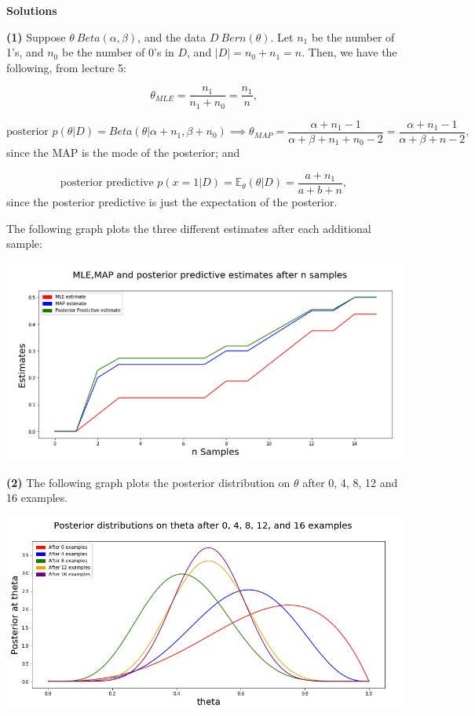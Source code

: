 \documentclass[submit]{harvardml}
\begin{document}
\noindent\textbf{Solutions}

\noindent\textbf{(1)} Suppose $\theta ~ Beta(\alpha,\beta)$, and the data $D ~ Bern(\theta)$. Let $n_1$ be the number of 1's, and $n_0$ be the number of 0's in $D$, and $|D| = n_0 +n_1 = n$. Then, we have the following, from lecture 5:


$$\boxed{ \theta_{MLE} = \frac{n_1}{n_1+n_0} = \frac{n_1}{n}},$$


$$\text{posterior } p(\theta | D) = Beta(\theta | \alpha + n_1, \beta + n_0) \implies \boxed {\theta_{MAP} = \frac{\alpha + n_1 -1}{\alpha + \beta + n_1 + n_0 -2} = \frac{\alpha + n_1 -1}{\alpha + \beta +n -2}},$$
since the MAP is the mode of the posterior; and

$$\text{posterior predictive } \boxed{p(x=1 | D) = \mathbb{E}_\theta (\theta | D) = \frac{a+n_1}{a+b+n}},$$
since the posterior predictive is just the expectation of the posterior.

\noindent The following graph plots the three different estimates after each additional sample:

\begin{center}
\includegraphics[scale=0.5]{beta-bernoulli_estimate_plot}
\end{center}

\bigskip

\noindent\textbf{(2)} The following graph plots the posterior distribution on $\theta$ after 0, 4, 8, 12 and 16 examples.

\begin{center}
\includegraphics[scale=0.5]{posterior_predictive_plors}
\end{center}
\end{document}
